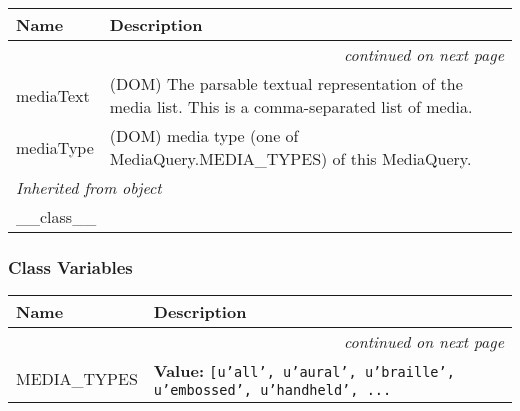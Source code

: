     \vspace{-1cm}
\hspace{\varindent}\begin{longtable}{|p{\varnamewidth}|p{\vardescrwidth}|l}
\cline{1-2}
\cline{1-2} \centering \textbf{Name} & \centering \textbf{Description}& \\
\cline{1-2}
\endhead\cline{1-2}\multicolumn{3}{r}{\small\textit{continued on next page}}\\\endfoot\cline{1-2}
\endlastfoot\raggedright m\-e\-d\-i\-a\-T\-e\-x\-t\- & \raggedright (DOM) The parsable textual representation of the media list.
This is a comma-separated list of media.&\\
\cline{1-2}
\raggedright m\-e\-d\-i\-a\-T\-y\-p\-e\- & \raggedright (DOM) media type (one of MediaQuery.MEDIA{\_}TYPES) of this MediaQuery.&\\
\cline{1-2}
\multicolumn{2}{|l|}{\textit{Inherited from object}}\\
\multicolumn{2}{|p{\varwidth}|}{\raggedright \_\_class\_\_}\\
\cline{1-2}
\end{longtable}



  \subsubsection{Class Variables}

    \vspace{-1cm}
\hspace{\varindent}\begin{longtable}{|p{\varnamewidth}|p{\vardescrwidth}|l}
\cline{1-2}
\cline{1-2} \centering \textbf{Name} & \centering \textbf{Description}& \\
\cline{1-2}
\endhead\cline{1-2}\multicolumn{3}{r}{\small\textit{continued on next page}}\\\endfoot\cline{1-2}
\endlastfoot\raggedright M\-E\-D\-I\-A\-\_\-T\-Y\-P\-E\-S\- & \raggedright \textbf{Value:} 
{\tt \texttt{[}\texttt{u'}\texttt{all}\texttt{'}\texttt{, }\texttt{u'}\texttt{aural}\texttt{'}\texttt{, }\texttt{u'}\texttt{braille}\texttt{'}\texttt{, }\texttt{u'}\texttt{embossed}\texttt{'}\texttt{, }\texttt{u'}\texttt{handheld}\texttt{'}\texttt{, }\texttt{...}}&\\
\cline{1-2}
\end{longtable}

